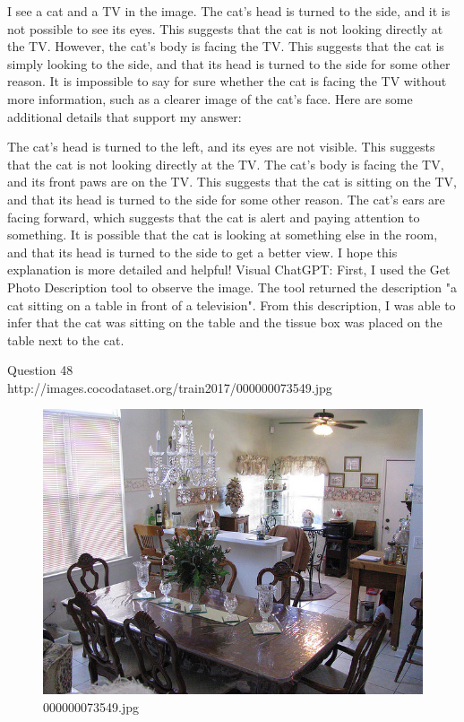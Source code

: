 \begin{enumerate}
    I see a cat and a TV in the image.
    The cat's head is turned to the side, and it is not possible to see its eyes. This suggests that the cat is not looking directly at the TV.
    However, the cat's body is facing the TV. This suggests that the cat is simply looking to the side, and that its head is turned to the side for some other reason.
    It is impossible to say for sure whether the cat is facing the TV without more information, such as a clearer image of the cat's face.
    Here are some additional details that support my answer:
    
    The cat's head is turned to the left, and its eyes are not visible. This suggests that the cat is not looking directly at the TV.
    The cat's body is facing the TV, and its front paws are on the TV. This suggests that the cat is sitting on the TV, and that its head is turned to the side for some other reason.
    The cat's ears are facing forward, which suggests that the cat is alert and paying attention to something. It is possible that the cat is looking at something else in the room, and that its head is turned to the side to get a better view.
    I hope this explanation is more detailed and helpful!
    \subitem Visual ChatGPT: First, I used the Get Photo Description tool to observe the image. The tool returned the description "a cat sitting on a table in front of a television". From this description, I was able to infer that the cat was sitting on the table and the tissue box was placed on the table next to the cat.
\end{enumerate}
Question 48\\
http://images.cocodataset.org/train2017/000000073549.jpg
\begin{figure}[h]
    \centering
    \includegraphics[width=0.8\linewidth]{../image set/hard/000000073549.jpg}
    \caption{000000073549.jpg}
\end{figure}
